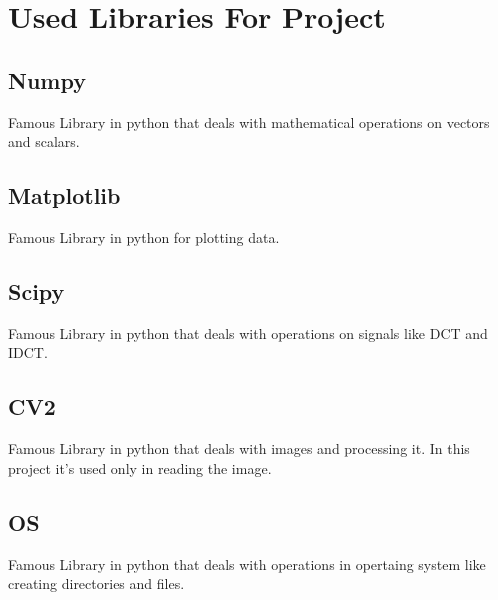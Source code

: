 \chapter{Used Libraries For Project}
\section{Numpy}
Famous Library in python that deals with mathematical operations on vectors and scalars.
\section{Matplotlib}
Famous Library in python for plotting data.
\section{Scipy}
Famous Library in python that deals with operations on signals like DCT and IDCT.
\section{CV2}
Famous Library in python that deals with images and processing it. In this project it's used only in reading the image.
\section{OS}
Famous Library in python that deals with operations in opertaing system like creating directories and files.
\\[50pt]
